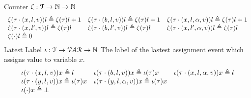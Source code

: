 %
Counter $\mathtt{\zeta} : \mathcal{T} \to \mathbb{N} \to \mathbb{N}$
\[
\begin{array}{lll}
\mathtt{\zeta}(\mathtt{\tau} \cdot (x, l, v) ) l \triangleq \mathtt{\zeta}(\mathtt{\tau}) l + 1
&
\mathtt{\zeta}(\mathtt{\tau} \cdot (b, l, v)) l \triangleq \mathtt{\zeta}(\mathtt{\tau}) l + 1
&
\mathtt{\zeta}(\mathtt{\tau} \cdot (x, l, \alpha, v)) l \triangleq \mathtt{\zeta}(\mathtt{\tau}) l + 1
\\
\mathtt{\zeta}(\mathtt{\tau}  \cdot (x, l', v)) l \triangleq \mathtt{\zeta}(\mathtt{\tau} ) l
&
\mathtt{\zeta}(\mathtt{\tau} \cdot (b, l', v)) l \triangleq \mathtt{\zeta}(\mathtt{\tau} ) l
&
\mathtt{\zeta}(\mathtt{\tau} \cdot (x, l', \alpha, v)) l \triangleq \mathtt{\zeta}(\mathtt{\tau} ) l
\\
\mathtt{\zeta}(\cdot) l \triangleq 0
&&
\end{array}
\]
%
Latest Label $\iota : \mathcal{T} \to \mathcal{VAR} \to \mathbb{N}$ 
The label of the lastest assignment event which assigns value to variable $x$.
\[
  \begin{array}{lll}
\iota(\mathtt{\tau} \cdot (x, l, v) ) x \triangleq l
&
\iota(\mathtt{\tau} \cdot (b, l, v)) x \triangleq \iota(\mathtt{\tau}) x
&
\iota(\mathtt{\tau} \cdot (x, l, \alpha, v)) x \triangleq l
\\
\iota(\mathtt{\tau}  \cdot (y, l, v)) x \triangleq \iota(\mathtt{\tau} ) x
&
\iota(\mathtt{\tau} \cdot (y, l, \alpha, v)) x \triangleq \iota(\mathtt{\tau} ) x
\\
\iota(\cdot) x \triangleq \bot
&&
\end{array}
\]
%
%

